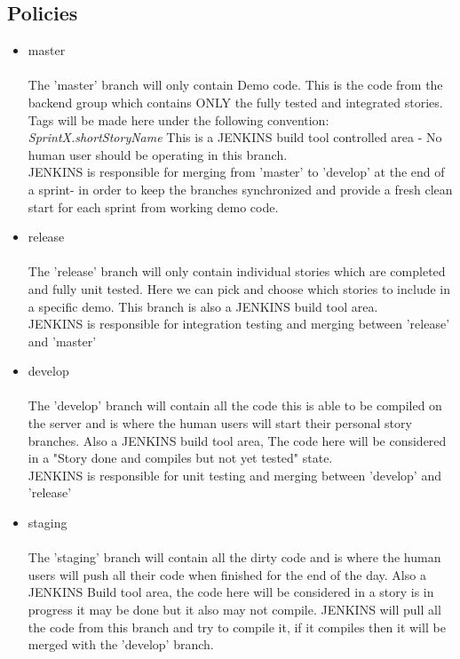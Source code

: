 \documentclass[11pt]{report}
\begin{document}
\subsection {Policies}
\begin{itemize}
\item master\\ \\
The 'master' branch will only contain Demo code. This is the code from the backend group which contains ONLY the fully tested and integrated stories.  \\Tags will be made here under the following convention:\\ \emph{SprintX.shortStoryName}\newpage
This is a JENKINS build tool controlled area - No human user should be operating in this branch. \\JENKINS is responsible for  merging from 'master' to 'develop' at the end of a sprint- in order to keep the branches synchronized and provide a fresh clean start for each sprint from working demo code.\\
\item release\\ \\
The 'release' branch will only contain individual stories which are completed and fully unit tested. Here we can pick and choose which stories to include in a specific demo. This branch is also a JENKINS build tool area. \\JENKINS is responsible for integration testing and merging between 'release' and 'master'
\item develop\\ \\
The 'develop' branch will contain all the code this is able to be compiled on the server and is where the human users will start their personal story branches. Also a JENKINS build tool area, The code here will be considered in a "Story done and compiles but not yet tested" state.\\ JENKINS is responsible for unit testing and merging between 'develop' and 'release'

\item staging \\ \\
The 'staging' branch will contain all the dirty code and is where the human users will push all their code when finished for the end of the day. Also a JENKINS Build tool area, the code here will be considered in a story is in progress it may be done but it also may not compile. JENKINS will pull all the code from this branch and try to compile it, if it compiles then it will be merged with the 'develop' branch.


\end{itemize}
\end{document}
